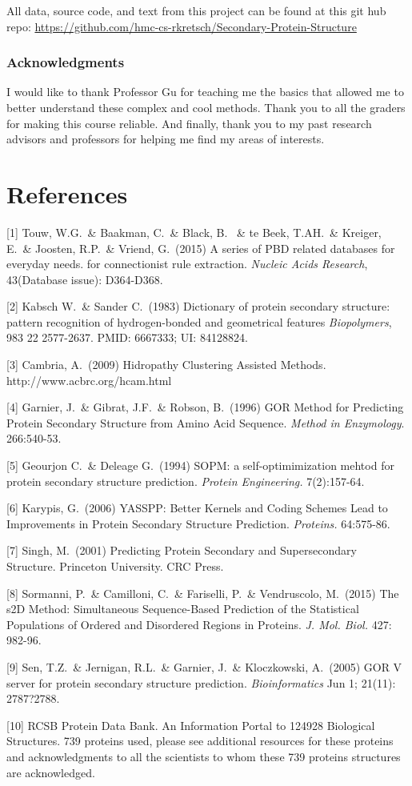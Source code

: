 \documentclass{article}
\begin{document}
All data, source code, and text from this project can be found at this git hub repo: \url{https://github.com/hmc-cs-rkretsch/Secondary-Protein-Structure}

\subsubsection*{Acknowledgments}

I would like to thank Professor Gu for teaching me the basics that allowed me to better understand these complex and cool methods. Thank you to all the graders for making this course reliable. And finally, thank you to my past research advisors and professors for helping me find my areas of interests.

\section*{References}

\small

[1] Touw, W.G.\ \& Baakman, C.\ \& Black, B. \ \& te Beek, T.AH.\ \& Kreiger, E.\ \& Joosten, R.P.\ \&
Vriend, G.\ (2015) A series of PBD related databases for everyday needs.
for connectionist rule extraction.  {\it Nucleic Acids Research}, 43(Database issue): D364-D368.

[2] Kabsch W.\ \& Sander C.\ (1983) Dictionary of protein secondary structure: pattern recognition of hydrogen-bonded and geometrical features {\it Biopolymers}, 983 22 2577-2637. PMID: 6667333; UI: 84128824.

[3] Cambria, A.\ (2009) Hidropathy Clustering Assisted Methods. http://www.acbrc.org/hcam.html

[4] Garnier, J.\ \& Gibrat, J.F.\ \& Robson, B.\ (1996) GOR Method for Predicting Protein Secondary Structure from Amino Acid Sequence. {\it Method in Enzymology}. 266:540-53.

[5] Geourjon C.\ \& Deleage G.\ (1994) SOPM: a self-optimimization mehtod for protein secondary structure prediction. {\it Protein Engineering.} 7(2):157-64.

[6] Karypis, G.\ (2006) YASSPP: Better Kernels and Coding Schemes Lead to Improvements in Protein Secondary Structure Prediction. {\it Proteins.} 64:575-86.

[7] Singh, M.\ (2001) Predicting Protein Secondary and Supersecondary Structure. Princeton University. CRC Press.

[8] Sormanni, P.\ \& Camilloni, C.\ \& Fariselli, P.\ \& Vendruscolo, M.\ (2015) The s2D Method: Simultaneous Sequence-Based Prediction of the Statistical Populations of Ordered and Disordered Regions in Proteins. {\it J. Mol. Biol.} 427: 982-96.

[9] Sen, T.Z.\ \& Jernigan, R.L.\ \& Garnier, J.\ \& Kloczkowski, A.\ (2005) GOR V server for protein secondary structure prediction. {\it Bioinformatics} Jun 1; 21(11): 2787?2788.

[10] RCSB Protein Data Bank. An Information Portal to 124928 Biological Structures. 739 proteins used, please see additional resources for these proteins and acknowledgments to all the scientists to whom these 739 proteins structures are acknowledged.
\end{document}
